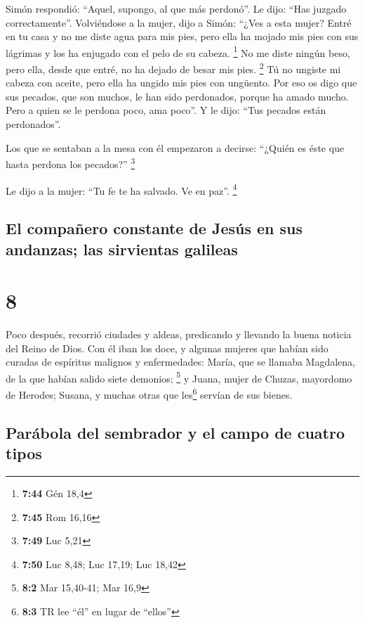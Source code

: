  Simón respondió: ``Aquel, supongo, al que más perdonó''.
Le dijo: ``Has juzgado correctamente''.  Volviéndose a la
mujer, dijo a Simón: ``¿Ves a esta mujer? Entré en tu casa y no me diste
agua para mis pies, pero ella ha mojado mis pies con sus lágrimas y los
ha enjugado con el pelo de su cabeza. \footnote{\textbf{7:44} Gén 18,4}
 No me diste ningún beso, pero ella, desde que entré, no
ha dejado de besar mis pies. \footnote{\textbf{7:45} Rom 16,16}
 Tú no ungiste mi cabeza con aceite, pero ella ha ungido
mis pies con ungüento.  Por eso os digo que sus pecados,
que son muchos, le han sido perdonados, porque ha amado mucho. Pero a
quien se le perdona poco, ama poco''.  Y le dijo: ``Tus
pecados están perdonados''.

 Los que se sentaban a la mesa con él empezaron a
decirse: ``¿Quién es éste que hasta perdona los pecados?'' \footnote{\textbf{7:49}
  Luc 5,21}

 Le dijo a la mujer: ``Tu fe te ha salvado. Ve en paz''.
\footnote{\textbf{7:50} Luc 8,48; Luc 17,19; Luc 18,42}

\hypertarget{el-compauxf1ero-constante-de-jesuxfas-en-sus-andanzas-las-sirvientas-galileas}{%
\subsection{El compañero constante de Jesús en sus andanzas; las
sirvientas
galileas}\label{el-compauxf1ero-constante-de-jesuxfas-en-sus-andanzas-las-sirvientas-galileas}}

\hypertarget{section-7}{%
\section{8}\label{section-7}}

 Poco después, recorrió ciudades y aldeas, predicando y
llevando la buena noticia del Reino de Dios. Con él iban los doce,
 y algunas mujeres que habían sido curadas de espíritus
malignos y enfermedades: María, que se llamaba Magdalena, de la que
habían salido siete demonios; \footnote{\textbf{8:2} Mar 15,40-41; Mar
  16,9}  y Juana, mujer de Chuzas, mayordomo de Herodes;
Susana, y muchas otras que les\footnote{\textbf{8:3} TR lee ``él'' en
  lugar de ``ellos''} servían de sus bienes.

\hypertarget{paruxe1bola-del-sembrador-y-el-campo-de-cuatro-tipos}{%
\subsection{Parábola del sembrador y el campo de cuatro
tipos}\label{paruxe1bola-del-sembrador-y-el-campo-de-cuatro-tipos}}

